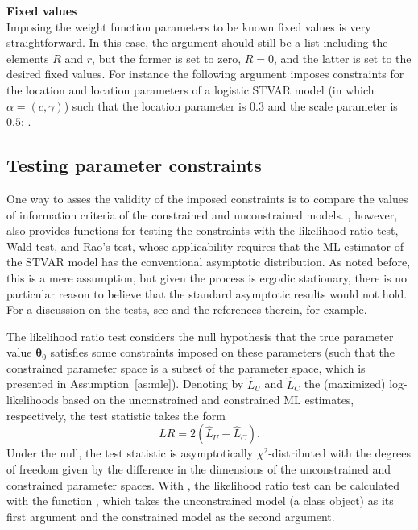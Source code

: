 \documentclass[nojss]{jss}
\begin{document}
\textbf{Fixed values}\\
Imposing the weight function parameters to be known fixed values is very straightforward. In this case, the argument  should still be a list including the elements $R$ and $r$, but the former is set to zero, $R=0$, and the latter is set to the desired fixed values. For instance the following argument imposes constraints for the location and location parameters of a logistic STVAR model (in which $\alpha = (c,\gamma)$) such that the location parameter is $0.3$ and the scale parameter is $0.5$: .

\subsection{Testing parameter constraints}\label{sec:testconst}
One way to asses the validity of the imposed constraints is to compare the values of information criteria of the constrained and unconstrained models. , however, also provides functions for testing the constraints with the likelihood ratio test, Wald test, and Rao's test, whose applicability requires that the ML estimator of the STVAR model has the conventional asymptotic distribution. As noted before, this is a mere assumption, but given the process is ergodic stationary, there is no particular reason to believe that the standard asymptotic results would not hold. For a discussion on the tests, see \citet{Buse:1982} and the references therein, for example.

The likelihood ratio test considers the null hypothesis that the true parameter value $\boldsymbol{\theta}_0$ satisfies some constraints imposed on these parameters (such that the constrained parameter space is a subset of the parameter space, which is presented in Assumption~\ref{as:mle}). Denoting by $\hat{L}_U$ and $\hat{L}_C$ the (maximized) log-likelihoods based on the unconstrained and constrained ML estimates, respectively, the test statistic takes the form
\begin{equation}
LR=2(\hat{L}_U - \hat{L}_C).
\end{equation}
Under the null, the test statistic is asymptotically $\chi^2$-distributed with the degrees of freedom given by the difference in the dimensions of the unconstrained and constrained parameter spaces. With , the likelihood ratio test can be calculated with the function , which takes the unconstrained model (a class  object) as its first argument and the constrained model as the second argument.
\end{document}
